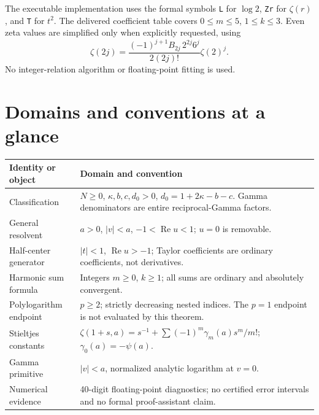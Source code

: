 \documentclass[11pt,a4paper]{article}
\numberwithin{equation}{section}
\theoremstyle{definition}\newtheorem{definition}[theorem]{Definition}
\theoremstyle{remark}\newtheorem{remark}[theorem]{Remark}
\newcommand{\Repart}{\operatorname{Re}}
\begin{document}
The executable implementation uses the formal symbols \texttt{L} for
$\log2$, \texttt{Zr} for $\zeta(r)$, and \texttt{T} for $t^2$.
The delivered coefficient table covers $0\le m\le5$, $1\le k\le3$.
Even zeta values are simplified only when explicitly requested, using
\begin{equation}
 \zeta(2j)=\frac{(-1)^{j+1}B_{2j}\,2^{2j}6^j}{2(2j)!}\zeta(2)^j.
 \label{eq:even-zeta}
\end{equation}
No integer-relation algorithm or floating-point fitting is used.

\section{Domains and conventions at a glance}
\begin{longtable}{@{}p{.29\linewidth}p{.65\linewidth}@{}}
\toprule
Identity or object & Domain and convention \\\midrule\endhead
Classification & $N\ge0$, $\kappa,b,c,d_0>0$, $d_0=1+2\kappa-b-c$.
Gamma denominators are entire reciprocal-Gamma factors.\\[4pt]
General resolvent & $a>0$, $|v|<a$, $-1<\Repart u<1$;
$u=0$ is removable.\\[4pt]
Half-center generator & $|t|<1$, $\Repart u>-1$;
Taylor coefficients are ordinary coefficients, not derivatives.\\[4pt]
Harmonic sum formula & Integers $m\ge0$, $k\ge1$; all sums are ordinary
and absolutely convergent.\\[4pt]
Polylogarithm endpoint & $p\ge2$; strictly decreasing nested indices.
The $p=1$ endpoint is not evaluated by this theorem.\\[4pt]
Stieltjes constants & $\zeta(1+s,a)=s^{-1}+\sum(-1)^m\gamma_m(a)s^m/m!$;
$\gamma_0(a)=-\psi(a)$.\\[4pt]
Gamma primitive & $|v|<a$, normalized analytic logarithm at $v=0$.\\[4pt]
Numerical evidence & 40-digit floating-point diagnostics; no certified
error intervals and no formal proof-assistant claim.\\
\bottomrule
\end{longtable}
\end{document}
